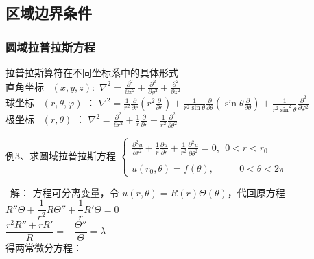 \subsection{区域边界条件}
\begin{frame}
	\frametitle{圆域拉普拉斯方程}	
	拉普拉斯算符在不同坐标系中的具体形式\\  \vspace{0.6 cm}	
	直角坐标~ $(x,y,z): $	{ 	$ \displaystyle  \nabla ^{2}  = \frac{\partial ^2}{\partial x^2} +\frac{\partial^2 }{\partial y^2} +\frac{\partial^2  }{\partial z^2}$}\\ 	
	球坐标~ $	(r,\theta, \varphi )$ ：
	{ 	$ \displaystyle  \nabla ^{2} =\frac{1}{r^2} \frac{\partial }{\partial r} (r^2\frac{\partial }{\partial r} )+
		\frac{1}{r^2 \sin \theta  } \frac{\partial }{\partial \theta } (\sin \theta \frac{\partial }{\partial \theta } )
		+\frac{1}{r^2 \sin^2 \theta  } \frac{\partial^2}{\partial\varphi ^2}$ } \\ 	
	极坐标~ $	(r,\theta)$ ：
	{ 	$ \displaystyle  \nabla ^{2} =\frac{\partial ^2 }{\partial r^2 } +\frac{1}{r } \frac{\partial }{\partial r } +
		\frac{1}{r^2 } \frac{\partial ^2 }{\partial \theta ^2 } $ }\\ 		
\end{frame}	
	
\begin{frame}	
	\begin{exampleblock} {例3、求圆域拉普拉斯方程}
	{ $  \displaystyle  \left \{ 
	\begin{array}{cc}
		\displaystyle {	\frac{\partial^2 u }{\partial r^2 } +\frac{1}{r } \frac{\partial u }{\partial r } +
			\frac{1}{r^2 } \frac{\partial ^2 u }{\partial \theta ^2
		} } =0, ~~ 0<r<r_0\\
		\\
		u(r_0,\theta )=f(\theta ) ,~~~~~~~~~~~~ 0<\theta <2\pi 
	\end{array}
	\right. $}  
	\end{exampleblock}	
	\alert{ 解：}	 
	方程可分离变量，令 $\displaystyle  u(r,\theta)=R(r) \Theta(\theta)$，代回原方程  \\ 
	{ $\displaystyle  R''\Theta +\dfrac{1}{r^2} R\Theta '' +\dfrac{1}{r}R'\Theta=0 $} \\ 
	{ $\displaystyle  \dfrac{r^2R''+rR'}{R}=-\dfrac{\Theta '' }{\Theta} =\lambda $} \\ 
	得两常微分方程：
\end{frame}	

